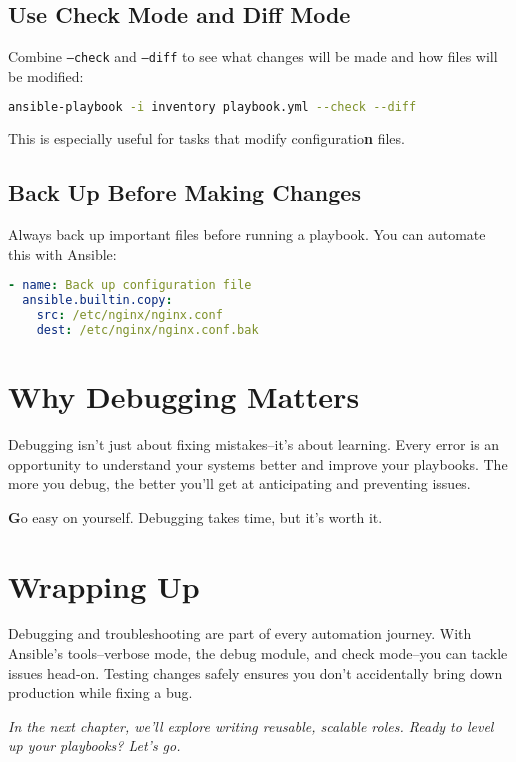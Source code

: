 \subsection{Use Check Mode and Diff Mode}

Combine \texttt{--check} and \texttt{--diff} to see what changes will be made and how files will be modified:
\begin{lstlisting}[language=bash, caption=Using Check and Diff Modes]
ansible-playbook -i inventory playbook.yml --check --diff
\end{lstlisting}

This is especially useful for tasks that modify configuratio\textbf{n} files.

\subsection{Back Up Before Making Changes}

Always back up important files before running a playbook. You can automate this with Ansible:
\begin{lstlisting}[language=yaml, caption=Backing Up a File]
- name: Back up configuration file
  ansible.builtin.copy:
    src: /etc/nginx/nginx.conf
    dest: /etc/nginx/nginx.conf.bak
\end{lstlisting}


\section{Why Debugging Matters}

Debugging isn't just about fixing mistakes--it's about learning. Every error is an opportunity to understand your systems better and improve your playbooks. The more you debug, the better you'll get at anticipating and preventing issues.

\textbf{G}o easy on yourself. Debugging takes time, but it's worth it.


\section{Wrapping Up}

Debugging and troubleshooting are part of every automation journey. With Ansible's tools--verbose mode, the debug module, and check mode--you can tackle issues head-on. Testing changes safely ensures you don't accidentally bring down production while fixing a bug.

\vspace{1em}

\textit{In the next chapter, we'll explore writing reusable, scalable roles. Ready to level up your playbooks? Let's go.}
